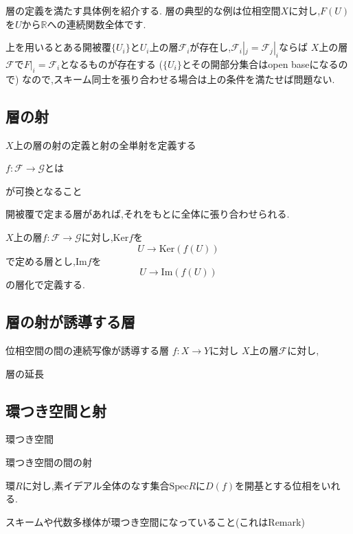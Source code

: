 層の定義を満たす具体例を紹介する.
層の典型的な例は位相空間$X$に対し,$F(U)$を$U$から$\mathbb{R}$への連続関数全体です.


\begin{rem}
 上を用いるとある開被覆$\{U_i\}$と$U_i$上の層$\mathcal{F}_i$が存在し,$\mathcal{F}_i|_j = \mathcal{F}_j|_i$ならば
 $X$上の層$\mathcal{F}$で$F|_i = \mathcal{F}_i$となるものが存在する
 ($\{U_i\}$とその開部分集合はopen baseになるので)
 なので,スキーム同士を張り合わせる場合は上の条件を満たせば問題ない.
\end{rem}

\subsection{層の射}
$X$上の層の射の定義と射の全単射を定義する
\begin{screen}
\begin{dfn}
$f: \mathcal{F} \to \mathcal{G}$とは


が可換となること
\end{dfn}
\end{screen}

開被覆で定まる層があれば,それをもとに全体に張り合わせられる.

\begin{screen}
\begin{dfn}
$X$上の層$f: \mathcal{F} \to \mathcal{G}$に対し,$\mathrm{Ker}f$を
\begin{equation*}
    U \to \mathrm{Ker} (f(U))
\end{equation*}
で定める層とし,$\mathrm{Im}f$を
\begin{equation*}
    U \to \mathrm{Im} (f(U))
\end{equation*}
の層化で定義する.

\end{dfn}
\end{screen}

\subsection{層の射が誘導する層}
位相空間の間の連続写像が誘導する層
$f: X \to Y$に対し
$X$上の層$\mathcal{F}$に対し,

層の延長

\subsection{環つき空間と射}

環つき空間

環つき空間の間の射
\begin{screen}
\begin{dfn}
環$R$に対し,素イデアル全体のなす集合$\mathrm{Spec}R$に$D(f)$を開基とする位相をいれる.
\end{dfn}
\end{screen}

スキームや代数多様体が環つき空間になっていること(これはRemark)

